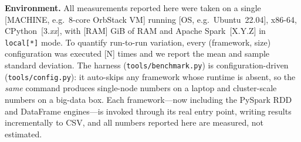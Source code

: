 %
%

\textbf{Environment.} All measurements reported here were taken on a single
[MACHINE, e.g.\ 8-core OrbStack VM] running [OS, e.g.\ Ubuntu~22.04], x86-64,
CPython~[3.\textit{xx}], with [RAM] GiB of RAM and Apache Spark~[X.Y.Z] in
\texttt{local[*]} mode. To quantify run-to-run variation, every
(framework, size) configuration was executed [N] times and we report the mean
and sample standard deviation. The harness (\texttt{tools/benchmark.py}) is
configuration-driven (\texttt{tools/config.py}): it auto-skips any framework
whose runtime is absent, so the \emph{same} command produces single-node numbers
on a laptop and cluster-scale numbers on a big-data box. Each framework---now
including the PySpark RDD and DataFrame engines---is invoked through its real
entry point, writing results incrementally to CSV, and all numbers reported here
are measured, not estimated.

